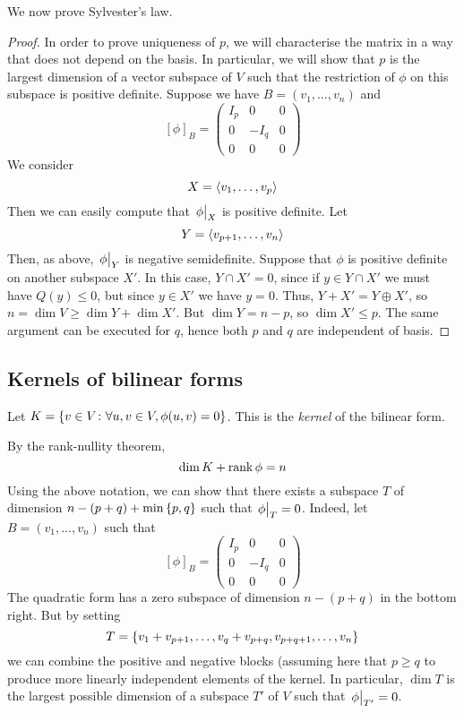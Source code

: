 \noindent We now prove Sylvester's law.
\begin{proof}
	In order to prove uniqueness of \( p \), we will characterise the matrix in a way that does not depend on the basis.
	In particular, we will show that \( p \) is the largest dimension of a vector subspace of \( V \) such that the restriction of \( \phi \) on this subspace is positive definite.
	Suppose we have \( B = (v_1, \dots, v_n) \) and
	\[
		[\phi]_B = \begin{pmatrix}
			I_p & 0    & 0 \\
			0   & -I_q & 0 \\
			0   & 0    & 0
		\end{pmatrix}
	\]
	We consider
	\[
		X = \langle{} v_1, \dots, v_p \rangle
	\]
	Then we can easily compute that \( \eval{\phi}_X \) is positive definite.
	Let
	\[
		Y = \langle{} v_{p+1}, \dots, v_n \rangle
	\]
	Then, as above, \( \eval{\phi}_Y \) is negative semidefinite.
	Suppose that \( \phi \) is positive definite on another subspace \( X' \).
	In this case, \( Y \cap X' = \qty{0} \), since if \( y \in Y \cap X' \) we must have \( Q(y) \leq 0 \), but since \( y \in X' \) we have \( y = 0 \).
	Thus, \( Y + X' = Y \oplus X' \), so \( n = \dim V \geq \dim Y + \dim X' \).
	But \( \dim Y = n - p \), so \( \dim X' \leq p \).
	The same argument can be executed for \( q \), hence both \( p \) and \( q \) are independent of basis.
\end{proof}

\subsection{Kernels of bilinear forms}
\begin{definition}
	Let \( K = \qty{ v \in V \colon \forall u,v \in V, \phi(u,v) = 0 } \).
	This is the \textit{kernel} of the bilinear form.
\end{definition}
\begin{remark}
	By the rank-nullity theorem,
	\[
		\dim K + \rank \phi = n
	\]
	Using the above notation, we can show that there exists a subspace \( T \) of dimension \( n - (p+q) + \min\qty{p,q} \) such that \( \eval{\phi}_T = 0 \).
	Indeed, let \( B = (v_1, \dots, v_n) \) such that
	\[
		[\phi]_B = \begin{pmatrix}
			I_p & 0    & 0 \\
			0   & -I_q & 0 \\
			0   & 0    & 0
		\end{pmatrix}
	\]
	The quadratic form has a zero subspace of dimension \( n - (p+q) \) in the bottom right.
	But by setting
	\[
		T = \qty{v_1 + v_{p+1}, \dots, v_q + v_{p+q}, v_{p+q+1}, \dots, v_n}
	\]
	we can combine the positive and negative blocks (assuming here that \( p \geq q \) to produce more linearly independent elements of the kernel.
	In particular, \( \dim T \) is the largest possible dimension of a subspace \( T' \) of \( V \) such that \( \eval{\phi}_{T'} = 0 \).
\end{remark}

